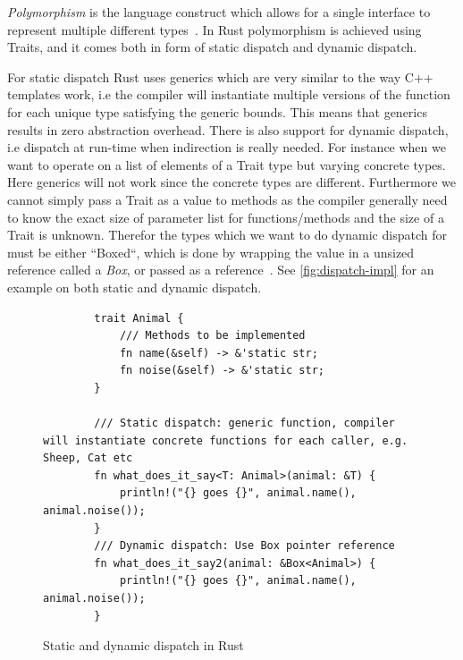 \documentclass[conference]{IEEEtran}
\begin{document}
\emph{Polymorphism} is the language construct which allows for a single interface to represent multiple different types~\cite{bjarne:polymorphism}.
In Rust polymorphism is achieved using Traits, and it comes both in form of static dispatch and dynamic dispatch.

For static dispatch Rust uses generics which are very similar to the way C++ templates work, i.e the compiler will instantiate multiple versions of the function for each unique type satisfying the generic bounds.
This means that generics results in zero abstraction overhead.
There is also support for dynamic dispatch, i.e dispatch at run-time when indirection is really needed.
For instance when we want to operate on a list of elements of a Trait type but varying concrete types.
Here generics will not work since the concrete types are different.
Furthermore we cannot simply pass a Trait as a value to methods as the compiler generally need to know the exact size of parameter list for functions/methods and the size of a Trait is unknown.
Therefor the types which we want to do dynamic dispatch for must be either ``Boxed``, which is done by wrapping the value in a unsized reference called a \emph{Box}, or passed as a reference~\cite{rustblog2015:traits}.
See \autoref{fig:dispatch-impl} for an example on both static and dynamic dispatch.
\begin{figure}[ht]
    \begin{verbatim}
        trait Animal {
            /// Methods to be implemented
            fn name(&self) -> &'static str;
            fn noise(&self) -> &'static str;
        }

        /// Static dispatch: generic function, compiler will instantiate concrete functions for each caller, e.g. Sheep, Cat etc
        fn what_does_it_say<T: Animal>(animal: &T) {
            println!("{} goes {}", animal.name(), animal.noise());
        }
        /// Dynamic dispatch: Use Box pointer reference
        fn what_does_it_say2(animal: &Box<Animal>) {
            println!("{} goes {}", animal.name(), animal.noise());
        }

    \end{verbatim}
    \caption{Static and dynamic dispatch in Rust}
    \label{fig:dispatch-impl}
\end{figure}
\end{document}
